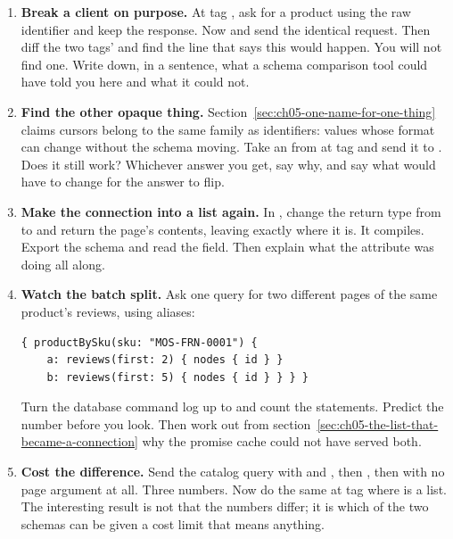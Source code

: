 \begin{enumerate}
  \item \textbf{Break a client on purpose.} At tag , ask
   for a product using the raw identifier
   and keep the response. Now
   and send the identical request. Then diff the two
  tags'  and find the line that says this would
  happen. You will not find one. Write down, in a sentence, what a schema
  comparison tool could have told you here and what it could not.

  \item \textbf{Find the other opaque thing.} Section~\ref{sec:ch05-one-name-for-one-thing}
  claims cursors belong to the same family as identifiers: values whose format
  can change without the schema moving. Take an  from
   at tag  and send it to . Does it
  still work? Whichever answer you get, say why, and say what would have to
  change for the answer to flip.

  \item \textbf{Make the connection into a list again.} In
  , change the return type from
   to  and return
  the page's contents, leaving \code{[UseConnection]} exactly where it is. It
  compiles. Export the schema and read the  field. Then explain
  what the attribute was doing all along.

  \item \textbf{Watch the batch split.} Ask one query for two different pages of
  the same product's reviews, using aliases:

  \begin{verbatim}
{ productBySku(sku: "MOS-FRN-0001") {
    a: reviews(first: 2) { nodes { id } }
    b: reviews(first: 5) { nodes { id } } } }
  \end{verbatim}

  Turn the database command log up to  and count the
  statements. Predict the number before you look. Then work out from
  section~\ref{sec:ch05-the-list-that-became-a-connection} why the promise cache
  could not have served both.

  \item \textbf{Cost the difference.} Send the catalog query with
   and , then
  , then with no page argument at all. Three numbers. Now do the
  same at tag  where  is a list. The interesting result
  is not that the numbers differ; it is which of the two schemas can be given a
  cost limit that means anything.


\end{enumerate}
